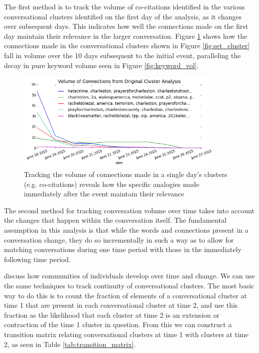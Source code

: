 \documentclass[12pt]{article}
\begin{document}
The first method is to track the volume of co-citations identified in the various conversational clusters identified on the first day of the analysis, as it changes over subsequent days. This indicates how well the connections made on the first day maintain their relevance in the larger conversation. Figure \ref{fig:cluster_over_time} shows how the connections made in the conversational clusters shown in Figure \ref{fig:set_cluster} fall in volume over the 10 days subsequent to the initial event, paralleling the decay in pure keyword volume seen in Figure \ref{fig:keyword_vol}.

\begin{figure}[!ht]
  \centering
    \includegraphics[width=0.9\textwidth]{F6_original_clusters_over_time.png}
    \caption{Tracking the volume of connections made in a single day's clusters (e.g. co-citations) reveals how the specific analogies made immediately after the event maintain their relevance}
  \label{fig:cluster_over_time}
\end{figure}

The second method for tracking conversation volume over time takes into account the changes that happen within the conversation itself. The fundamental assumption in this analysis is that while the words and connections present in a conversation change, they do so incrementally in such a way as to allow for matching conversations during one time period with those in the immediately following time period. 

\cite{Palla2007} discuss how communities of individuals develop over time and change. We can use the same techniques to track continuity of conversational clusters. The most basic way to do this is to count the fraction of elements of a conversational cluster at time 1 that are present in each conversational cluster at time 2, and use this fraction as the likelihood that each cluster at time 2 is an extension or contraction of the time 1 cluster in question. From this we can construct a transition matrix relating conversational clusters at time 1 with clusters at time 2, as seen in Table \ref{tab:transition_matrix}.
\end{document}
